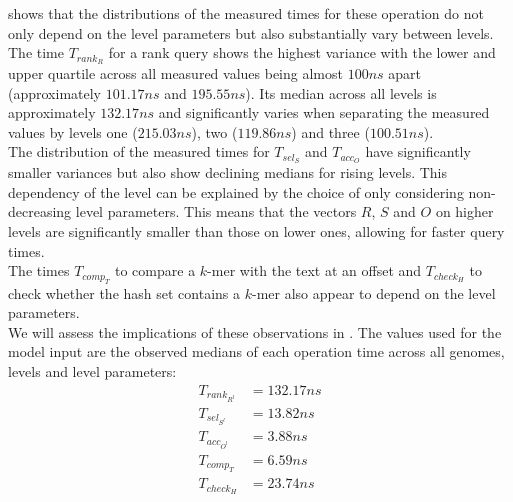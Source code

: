 \documentclass[a4paper,titlepage,onecolumn,oneside,12pt,nenglish,titlepage=firstiscover]{scrbook}
\theoremstyle{plain} %
\theoremstyle{definition} %
\theoremstyle{remark} %
\theoremstyle{plain}
\newcommand{\access}{acc}
\newcommand{\contains}{rank}
\newcommand{\select}{sel}
\newcommand{\compare}{comp}
\newcommand{\timeForOperationOnStructure}[2]{T_{#1_{#2}}} %
\begin{document}
 shows that the distributions of the measured times for these operation do not only depend on the level parameters but also substantially vary between levels. The time $\timeForOperationOnStructure{\contains}{R}$ for a rank query shows the highest variance with the lower and upper quartile across all measured values being almost $100ns$ apart (approximately $101.17ns$ and $195.55ns$). Its median across all levels is approximately $132.17ns$ and significantly varies when separating the measured values by levels one ($215.03ns$), two ($119.86ns$) and three ($100.51ns$).\\
The distribution of the measured times for $\timeForOperationOnStructure{\select}{S}$ and
$\timeForOperationOnStructure{\access}{O}$ have significantly smaller variances but also show declining medians for rising levels. This dependency of the level can be explained by the choice of only considering non-decreasing level parameters. This means that the vectors $R$, $S$ and $O$ on higher levels are significantly smaller than those on lower ones, allowing for faster query times.\\
The times $\timeForOperationOnStructure{\compare}{T}$ to compare a $k$-mer with the text at an offset and $\timeForOperationOnStructure{check}{H}$ to check whether the hash set contains a $k$-mer also appear to depend on the level parameters.\\

We will assess the implications of these observations in . The values used for the model input are the observed medians of each operation time across all genomes, levels and level parameters:
\begin{align}
	\timeForOperationOnStructure{\contains}{R^l} &= 132.17ns\\
	\timeForOperationOnStructure{\select}{S^l} &= 13.82ns  \\
	\timeForOperationOnStructure{\access}{O^l} &= 3.88ns  \\
	\timeForOperationOnStructure{\compare}{T} &= 6.59ns   \\
	\timeForOperationOnStructure{check}{H} &= 23.74ns
\end{align}
\end{document}
